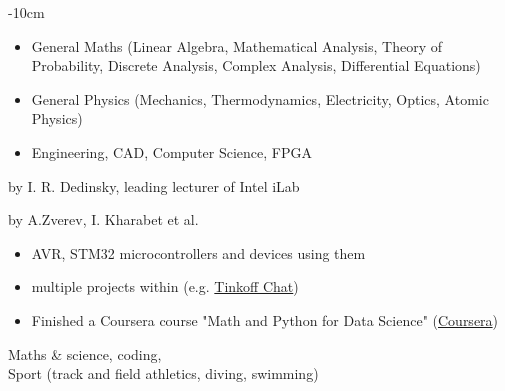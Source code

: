 \documentclass[10pt,a4paper]{cv}
\begin{document}
%
%
	

\begin{adjustwidth}{}{-10cm}
\makecvheader
\end{adjustwidth}



\divider
{}

\begin{itemize}
\item General Maths (Linear Algebra, Mathematical Analysis, Theory of Probability, Discrete Analysis, Complex Analysis, Differential Equations)
\item General Physics (Mechanics, Thermodynamics, Electricity, Optics, Atomic Physics)
\item Engineering, CAD, Computer Science, FPGA
\end{itemize}


by I. R. Dedinsky, leading lecturer of Intel iLab

by A.Zverev, I. Kharabet et al.

\begin{itemize}
\item {}
AVR, STM32 microcontrollers and devices using them 
\item {}
multiple projects within (e.g. \href{https://github.com/pokhachevskiy/TinkoffChat}{Tinkoff Chat})
\item  {}
Finished a Coursera course "Math and Python for Data Science" (\href{https://www.coursera.org/account/accomplishments/certificate/CMNH9NCQQ7TD}{Coursera})
\end{itemize}
Maths \& science, coding, 
\\Sport (track and field athletics, diving, swimming)
\end{document}
